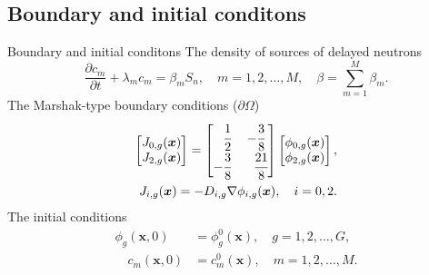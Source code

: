 \documentclass[10pt,pdf,hyperref={unicode}]{beamer}
\begin{document}
\subsection{Boundary and initial conditons}
	\begin{frame}{Boundary and initial conditons}
		The density of sources of delayed neutrons
		\[
			\frac{\partial c_m}{\partial t} + \lambda_m c_m = \beta_m S_{n}, \quad m = 1,2,\dots,M,
			\quad
			\beta = \sum_{m=1}^{M} \beta_m.
		\] 
		The Marshak-type boundary conditions ($\partial \Omega$)
		\[
		\begin{split}
			\begin{bmatrix}
				J_{0,g}(\bm x) \\
				J_{2,g}(\bm x) \\
			\end{bmatrix}
			=
			\begin{bmatrix}
				\phantom{-} \cfrac{1}{2} & - \cfrac{3}{8} \\
				-\cfrac{3}{8} & \phantom{-} \cfrac{21}{8} \\
			\end{bmatrix}
			\begin{bmatrix}
				\phi_{0,g}(\bm x) \\
				\phi_{2,g}(\bm x) \\
			\end{bmatrix}, \\
			J_{i,g}(\bm x) = - D_{i,g} \nabla \phi_{i,g}(\bm x), \quad i = 0, 2.
		\end{split}
		\]
		The initial conditions
		\[
		\begin{split}
			\phi_g(\bm x,0) & = \phi_g^0(\bm x), \quad g = 1,2,\dots,G, \\ 
			\quad c_m(\bm x,0) & = c_m^0(\bm x), \quad m = 1,2,\dots,M.
		\end{split}
		\]
	\end{frame}
\end{document}
